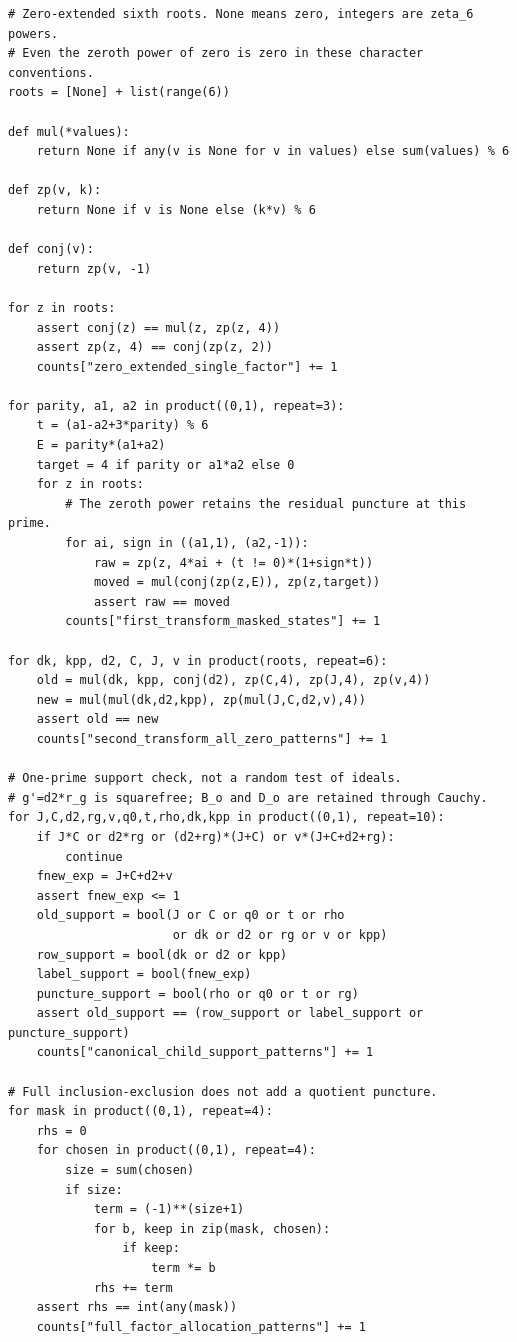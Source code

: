 \documentclass[12pt]{article}
\begin{document}
\begin{verbatim}
# Zero-extended sixth roots. None means zero, integers are zeta_6 powers.
# Even the zeroth power of zero is zero in these character conventions.
roots = [None] + list(range(6))

def mul(*values):
    return None if any(v is None for v in values) else sum(values) % 6

def zp(v, k):
    return None if v is None else (k*v) % 6

def conj(v):
    return zp(v, -1)

for z in roots:
    assert conj(z) == mul(z, zp(z, 4))
    assert zp(z, 4) == conj(zp(z, 2))
    counts["zero_extended_single_factor"] += 1

for parity, a1, a2 in product((0,1), repeat=3):
    t = (a1-a2+3*parity) % 6
    E = parity*(a1+a2)
    target = 4 if parity or a1*a2 else 0
    for z in roots:
        # The zeroth power retains the residual puncture at this prime.
        for ai, sign in ((a1,1), (a2,-1)):
            raw = zp(z, 4*ai + (t != 0)*(1+sign*t))
            moved = mul(conj(zp(z,E)), zp(z,target))
            assert raw == moved
        counts["first_transform_masked_states"] += 1

for dk, kpp, d2, C, J, v in product(roots, repeat=6):
    old = mul(dk, kpp, conj(d2), zp(C,4), zp(J,4), zp(v,4))
    new = mul(mul(dk,d2,kpp), zp(mul(J,C,d2,v),4))
    assert old == new
    counts["second_transform_all_zero_patterns"] += 1

# One-prime support check, not a random test of ideals.
# g'=d2*r_g is squarefree; B_o and D_o are retained through Cauchy.
for J,C,d2,rg,v,q0,t,rho,dk,kpp in product((0,1), repeat=10):
    if J*C or d2*rg or (d2+rg)*(J+C) or v*(J+C+d2+rg):
        continue
    fnew_exp = J+C+d2+v
    assert fnew_exp <= 1
    old_support = bool(J or C or q0 or t or rho
                       or dk or d2 or rg or v or kpp)
    row_support = bool(dk or d2 or kpp)
    label_support = bool(fnew_exp)
    puncture_support = bool(rho or q0 or t or rg)
    assert old_support == (row_support or label_support or puncture_support)
    counts["canonical_child_support_patterns"] += 1

# Full inclusion-exclusion does not add a quotient puncture.
for mask in product((0,1), repeat=4):
    rhs = 0
    for chosen in product((0,1), repeat=4):
        size = sum(chosen)
        if size:
            term = (-1)**(size+1)
            for b, keep in zip(mask, chosen):
                if keep:
                    term *= b
            rhs += term
    assert rhs == int(any(mask))
    counts["full_factor_allocation_patterns"] += 1


\end{verbatim}
\end{document}
